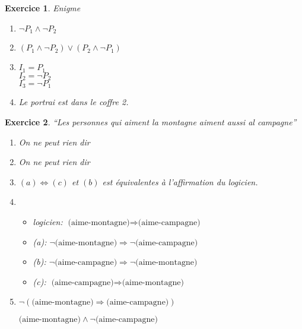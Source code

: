 \documentclass{article}
\theoremstyle{plain}
\newtheorem{exo}{Exercice}%
\begin{document}
\begin{exo} Enigme
\begin{enumerate}
    \item $\neg P_1 \wedge \neg P_2$
    \item $(P_1 \wedge \neg P_2) \vee (P_2 \wedge \neg P_1)$
    \item $I_1 = P_1$\\
        $I_2 = \neg P_2$ \\
        $I_3 = \neg P_1$
    \item Le portrai est dans le coffre 2.
\end{enumerate}
\end{exo}

\begin{exo} ``Les personnes qui aiment la montagne aiment aussi al campagne''
\begin{enumerate}
    \item On ne peut rien dir
    \item On ne peut rien dir
    \item $(a) \Leftrightarrow (c)$ et $(b)$ est équivalentes à l'affirmation du logicien.
    \item \begin{itemize}
        \item logicien: $\text{(aime-montagne)} \Rightarrow \text{(aime-campagne)}$
        \item (a): $\neg \text{(aime-montagne)} \Rightarrow \neg \text{(aime-campagne)}$
        \item (b): $\neg \text{(aime-campagne)} \Rightarrow \neg \text{(aime-montagne)}$
        \item (c): $\text{(aime-campagne)} \Rightarrow \text{(aime-montagne)}$
    \end{itemize}
    \item $\neg (\text{(aime-montagne)} \Rightarrow \text{(aime-campagne)})$

    $\text{(aime-montagne)} \wedge \neg \text{(aime-campagne)}$
\end{enumerate}
\end{exo}
\end{document}
